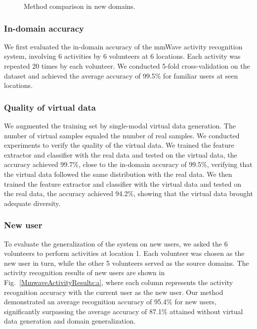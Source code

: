 \documentclass[journal]{IEEEtran}
\begin{document}
\begin{figure*}
\begin{center}
\hspace{0.5cm}
\hspace{0.5cm}
\caption{Method comparison in new domains.}
\label{FigMmwaveComparison}
\end{center}
\end{figure*}

\subsubsection{In-domain accuracy}
We first evaluated the in-domain accuracy of the mmWave activity recognition system, involving 6 activities by 6 volunteers at 6 locations. Each activity was repeated 20 times by each volunteer. We conducted 5-fold cross-validation on the dataset and achieved the average accuracy of 99.5\% for familiar users at seen locations.

\subsubsection{Quality of virtual data}
We augmented the training set by single-modal virtual data generation. The number of virtual samples equaled the number of real samples. We conducted experiments to verify the quality of the virtual data. We trained the feature extractor and classifier with the real data and tested on the virtual data, the accuracy achieved 99.7\%, close to the in-domain accuracy of 99.5\%, verifying that the virtual data followed the same distribution with the real data. We then trained the feature extractor and classifier with the virtual data and tested on the real data, the accuracy achieved 94.2\%, showing that the virtual data brought adequate diversity.

\subsubsection{New user}
To evaluate the generalization of the system on new users, we asked the 6 volunteers to perform activities at location 1. Each volunteer was chosen as the new user in turn, while the other 5 volunteers served as the source domains. The activity recognition results of new users are shown in Fig.~\ref{MmwaveActivityResults:a}, where each column represents the activity recognition accuracy with the current user as the new user. Our method demonstrated an average recognition accuracy of 95.4\% for new users, significantly surpassing the average accuracy of 87.1\% attained without virtual data generation and domain generalization.
\end{document}
